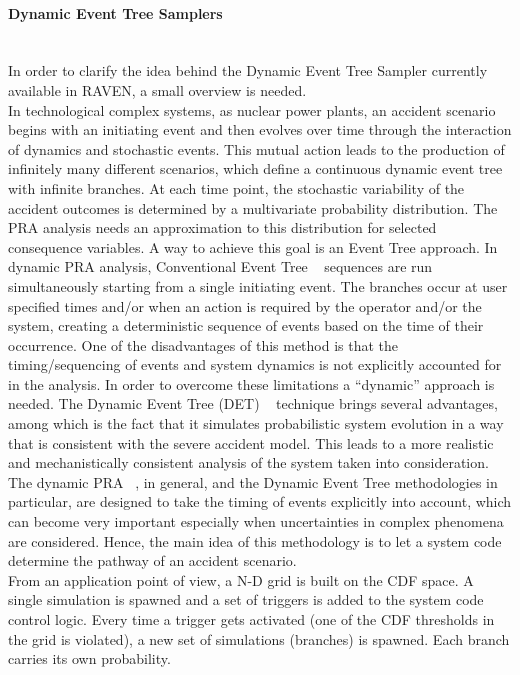 \paragraph{Dynamic Event Tree Samplers}~\\
In order to clarify the idea behind the Dynamic Event Tree Sampler currently available in RAVEN, a small overview is needed.
\\In technological complex systems, as nuclear power plants, an accident scenario begins with an initiating event and then evolves over time through the interaction of dynamics and stochastic events. This mutual action leads to the production of infinitely many different scenarios, which define a continuous dynamic event tree with infinite branches. At each time point, the stochastic variability of the accident outcomes is determined by a multivariate probability distribution. The PRA analysis needs an approximation to this distribution for selected consequence variables. A way to achieve this goal is an Event Tree approach. In dynamic PRA analysis, Conventional Event Tree ~\cite{} sequences are run simultaneously starting from a single initiating event. The branches occur at user specified times and/or when an action is required by the operator and/or the system, creating a deterministic sequence of events based on the time of their occurrence. One of the disadvantages of this method is that the timing/sequencing of events and system dynamics is not explicitly accounted for in the analysis. In order to overcome these limitations a “dynamic” approach is needed. The Dynamic Event Tree (DET) ~\cite{} technique brings several advantages, among which is the fact that it simulates probabilistic system evolution in a way that is consistent with the severe accident model. This leads to a more realistic and mechanistically consistent analysis of the system taken into consideration. The dynamic PRA ~\cite{}, in general, and the Dynamic Event Tree methodologies in particular, are designed to take the timing of events explicitly into account, which can become very important especially when uncertainties in complex phenomena are considered. Hence, the main idea of this methodology is to let a system code determine the pathway of an accident scenario.
\\From an application point of view, a N-D grid is built on the CDF space. A single simulation is spawned and a set of triggers is added to the system code control logic. Every time a trigger gets activated (one of the CDF thresholds in the grid is violated), a new set of simulations (branches) is spawned. Each branch carries its own probability.
